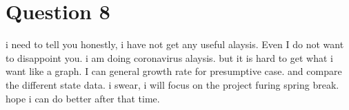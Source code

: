 \documentclass{article}
\begin{document}
\section{Question 8}
i need to tell you honestly, i have not get any useful alaysis. Even I do not want to disappoint you. i am doing coronavirus alaysis. but it is hard to get what i want like a graph. I can general growth rate for presumptive case. and compare the different state data.
i swear, i will focus on the project furing spring break. hope i can do better after that time.
 
\end{document}
